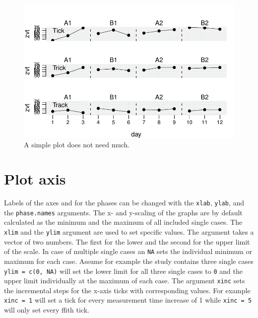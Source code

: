 \documentclass[
  letterpaper,
  DIV=11,
  numbers=noendperiod]{scrreprt}
\begin{document}
\begin{figure}[H]

{\centering \includegraphics{./app_supseded_functions_files/figure-pdf/ex-simple-plot-1.pdf}

}

\caption{A simple plot does not need much.}

\end{figure}

\hypertarget{plot-axis}{%
\section{Plot axis}\label{plot-axis}}

Labels of the axes and for the phases can be changed with the
\texttt{xlab}, \texttt{ylab}, and the \texttt{phase.names} arguments.
The x- and y-scaling of the graphs are by default calculated as the
minimum and the maximum of all included single cases. The \texttt{xlim}
and the \texttt{ylim} argument are used to set specific values. The
argument takes a vector of two numbers. The first for the lower and the
second for the upper limit of the scale. In case of multiple single
cases an \texttt{NA} sets the individual minimum or maximum for each
case. Assume for example the study contains three single cases
\texttt{ylim\ =\ c(0,\ NA)} will set the lower limit for all three
single cases to \texttt{0} and the upper limit individually at the
maximum of each case. The argument \texttt{xinc} sets the incremental
steps for the x-axis ticks with corresponding values. For example
\texttt{xinc\ =\ 1} will set a tick for every measurement time increase
of 1 while \texttt{xinc\ =\ 5} will only set every ffith tick.
\end{document}
